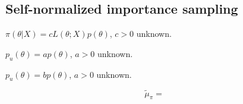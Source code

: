 \documentclass[
  12pt]{article}
\begin{document}
\subsection{Self-normalized importance
sampling}\label{self-normalized-importance-sampling}

\(\pi(\theta | X) = cL(\theta;X)p(\theta)\), \(c > 0\) unknown.

\(p_u(\theta) = a p(\theta)\), \(a > 0\) unknown.

\(p_u(\theta) = b p(\theta)\), \(a > 0\) unknown.

\[
\tilde{\mu}_{\pi} = \frac{}{}
\]


  
\end{document}
